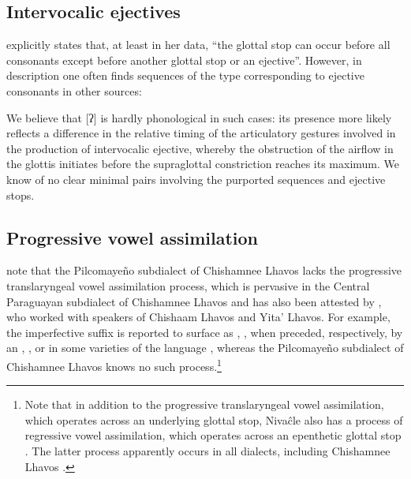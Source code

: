 \subsection{Intervocalic ejectives}\label{ni-eject}
\citet[54]{AnG15} explicitly states that, at least in her data, ``the glottal stop can occur before all consonants except before another glottal stop or an ejective''. However, in  description one often finds sequences of the type  corresponding to ejective consonants in other sources:

\ea
    \begin{xlist}
        \ex {} \recind {}
        \ex {} \recind {}
        \ex {} \recind {}
        \ex {} \recind {}
    \end{xlist}
\z
{}

We believe that [ʔ] is hardly phonological in such cases: its presence more likely reflects a difference in the relative timing of the articulatory gestures involved in the production of intervocalic ejective, whereby the obstruction of the airflow in the glottis initiates before the supraglottal constriction reaches its maximum. We know of no clear minimal pairs involving the purported  sequences and ejective stops.

\subsection{Progressive vowel assimilation}\label{ni-translar}
\largerpage[2]
\citet[10, 317]{LC20} note that the Pilcomayeño subdialect of Chishamnee Lhavos lacks the progressive translaryngeal vowel assimilation process, which is pervasive in the Central Paraguayan subdialect of Chishamnee Lhavos and has also been attested by \citet{AnG16b}, who worked with speakers of Chishaam Lhavos and Yita' Lhavos. For example, the imperfective suffix  is reported to surface as , ,  when preceded, respectively, by an , , or  in some varieties of the language \citep[339--340]{AnG16b}, whereas the Pilcomayeño subdialect of Chishamnee Lhavos knows no such process.\footnote{Note that in addition to the progressive translaryngeal vowel assimilation, which operates across an underlying glottal stop, Nivaĉle also has a process of regressive vowel assimilation, which operates across an epenthetic glottal stop \citep[340–341]{AnG16b}. The latter process apparently occurs in all dialects, including Chishamnee Lhavos \citep[167–168]{LC20,NS87}.}

